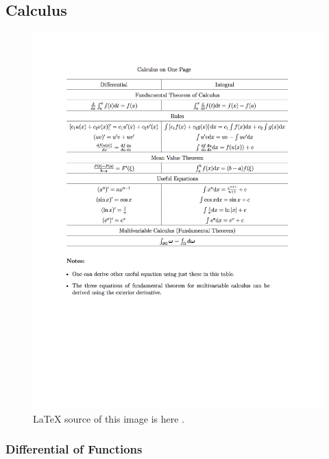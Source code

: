 \documentclass[letterpaper,10pt,english]{sphinxmanual}
\begin{document}
\subsection{Calculus}
\label{math:calculus}\begin{figure}[htbp]
\centering
\capstart

\includegraphics{DifferentialANDIntegralOnOnePage.png}
\caption{LaTeX source of this image is here .}\end{figure}


\subsubsection{Differential of Functions}
\label{math:differential-of-functions}
\end{document}
